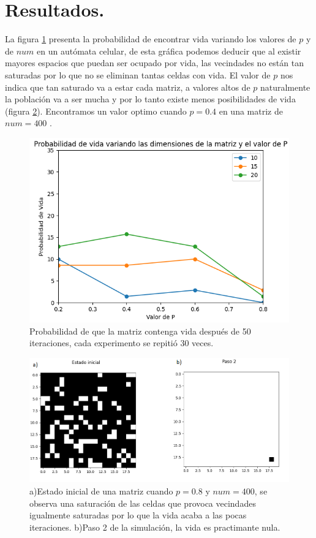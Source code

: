 \documentclass{article}
\begin{document}
\section{Resultados.}
La figura \ref{prob} presenta la probabilidad de encontrar vida variando los valores de $p$ y de $num$ en un autómata celular, de esta gráfica podemos deducir que al existir mayores espacios que puedan ser ocupado por vida, las vecindades no están tan saturadas por lo que no se eliminan tantas celdas con vida. El valor de $p$ nos indica que tan saturado va a estar cada matriz, a valores altos de $p$ naturalmente la población va a ser mucha y por lo tanto existe menos posibilidades de vida (figura \ref{p0.8}). Encontramos un valor optimo cuando $p=0.4$ en una matriz de $num=400$ .
\begin{figure} 
    \centering
    \includegraphics[width=140mm]{prob.png} 
    \caption{Probabilidad de que la matriz contenga vida después de 50 iteraciones, cada experimento se repitió 30 veces.}
    \label{prob}
\end{figure}
\begin{figure} 
    \centering
    \includegraphics[width=140mm]{p0.4.png} 
    \caption{a)Estado inicial de una matriz cuando $p=0.8$ y $num=400$, se observa una saturación de las celdas que provoca vecindades igualmente saturadas por lo que la vida acaba a las pocas iteraciones. b)Paso 2 de la simulación, la vida es practimante nula.}
    \label{p0.8}
\end{figure}
\end{document}
